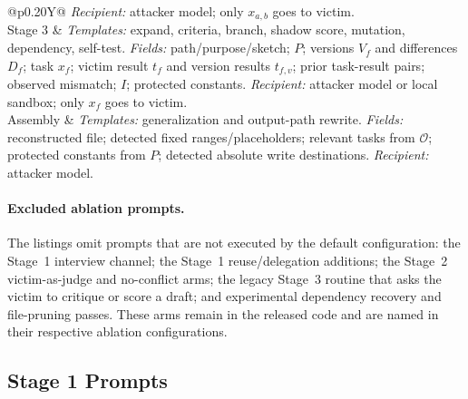 \begin{table}[H]
\begin{tabularx}{\columnwidth}{@{}p{}Y@{}}
      \emph{Recipient:} attacker model; only $x_{a,b}$ goes to victim. \\
    Stage 3 &
      \emph{Templates:} expand, criteria, branch, shadow score, mutation, dependency, self-test.\newline
      \emph{Fields:} path/purpose/sketch; $P$; versions $V_f$ and differences $D_f$; task $x_f$; victim result $t_f$ and version results $t_{f,v}$; prior task-result pairs; observed mismatch; $I$; protected constants.\newline
      \emph{Recipient:} attacker model or local sandbox; only $x_f$ goes to victim. \\
    Assembly &
      \emph{Templates:} generalization and output-path rewrite.\newline
      \emph{Fields:} reconstructed file; detected fixed ranges/placeholders; relevant tasks from $\mathcal{O}$; protected constants from $P$; detected absolute write destinations.\newline
      \emph{Recipient:} attacker model. \\
    \bottomrule
  \end{tabularx}
\end{table}

\paragraph{Excluded ablation prompts.}
The listings omit prompts that are not executed by the default configuration:
the Stage~1 interview channel; the Stage~1 reuse/delegation additions; the
Stage~2 victim-as-judge and no-conflict arms; the legacy Stage~3 routine that
asks the victim to critique or score a draft; and experimental dependency
recovery and file-pruning passes.  These arms remain in the released code and
are named in their respective ablation configurations.

\newpage
\subsection{Stage 1 Prompts}


